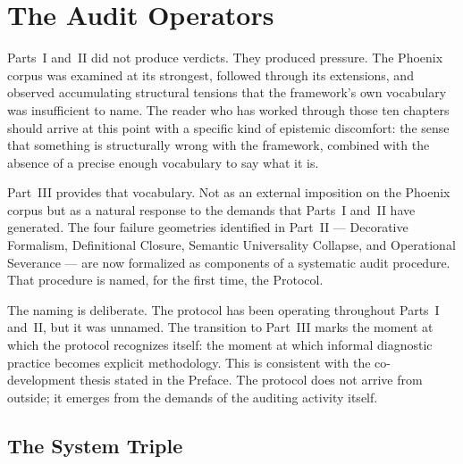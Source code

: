 
\chapter{The Audit Operators}
\label{ch:audit-operators}


\noindent
Parts~I and~II did not produce verdicts. They produced pressure.
The Phoenix corpus was examined at its strongest, followed
through its extensions, and observed accumulating structural
tensions that the framework's own vocabulary was insufficient
to name. The reader who has worked through those ten chapters
should arrive at this point with a specific kind of epistemic
discomfort: the sense that something is structurally wrong
with the framework, combined with the absence of a precise
enough vocabulary to say what it is.

Part~III provides that vocabulary. Not as an external imposition
on the Phoenix corpus but as a natural response to the
demands that Parts~I and~II have generated. The four failure
geometries identified in Part~II --- Decorative Formalism,
Definitional Closure, Semantic Universality Collapse, and
Operational Severance --- are now formalized as components
of a systematic audit procedure. That procedure is named,
for the first time, the \Ortyx{} Protocol.

The naming is deliberate. The protocol has been operating
throughout Parts~I and~II, but it was unnamed. The transition
to Part~III marks the moment at which the protocol recognizes
itself: the moment at which informal diagnostic practice
becomes explicit methodology. This is consistent with the
co-development thesis stated in the Preface. The protocol
does not arrive from outside; it emerges from the demands
of the auditing activity itself.

\section{The System Triple}
\label{sec:system-triple}

